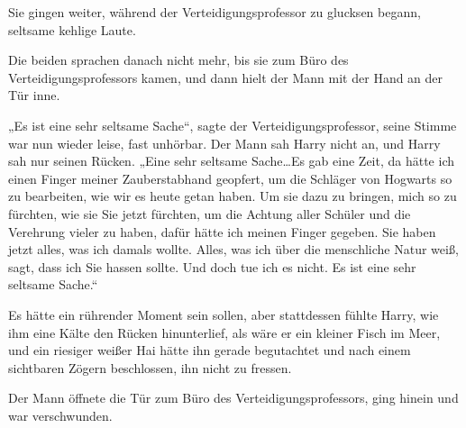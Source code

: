 Sie gingen weiter, während der Verteidigungsprofessor zu glucksen begann, seltsame kehlige Laute.

Die beiden sprachen danach nicht mehr, bis sie zum Büro des Verteidigungsprofessors kamen, und dann hielt der Mann mit der Hand an der Tür inne.

„Es ist eine sehr seltsame Sache“, sagte der Verteidigungsprofessor, seine Stimme war nun wieder leise, fast unhörbar. Der Mann sah Harry nicht an, und Harry sah nur seinen Rücken. „Eine sehr seltsame Sache…Es gab eine Zeit, da hätte ich einen Finger meiner Zauberstabhand geopfert, um die Schläger von Hogwarts so zu bearbeiten, wie wir es heute getan haben. Um sie dazu zu bringen, mich so zu fürchten, wie sie Sie jetzt fürchten, um die Achtung aller Schüler und die Verehrung vieler zu haben, dafür hätte ich meinen Finger gegeben. Sie haben jetzt alles, was ich damals wollte. Alles, was ich über die menschliche Natur weiß, sagt, dass ich Sie hassen sollte. Und doch tue ich es nicht. Es ist eine sehr seltsame Sache.“

Es hätte ein rührender Moment sein sollen, aber stattdessen fühlte Harry, wie ihm eine Kälte den Rücken hinunterlief, als wäre er ein kleiner Fisch im Meer, und ein riesiger weißer Hai hätte ihn gerade begutachtet und nach einem sichtbaren Zögern beschlossen, ihn nicht zu fressen.

Der Mann öffnete die Tür zum Büro des Verteidigungsprofessors, ging hinein und war verschwunden.

